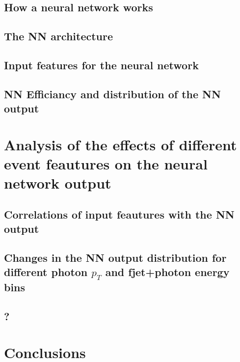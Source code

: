 \section{How a neural network works}
\section{The NN architecture}
\section{Input features for the neural network}
\section{NN Efficiancy and distribution of the NN output}
\chapter{Analysis of the effects of different event feautures on the neural network output}
\section{Correlations of input feautures with the NN output}
\section{Changes in the NN output distribution for different photon \texorpdfstring{$p_T$}{TEXT} and fjet+photon energy bins}
\section{?}
\chapter{Conclusions}